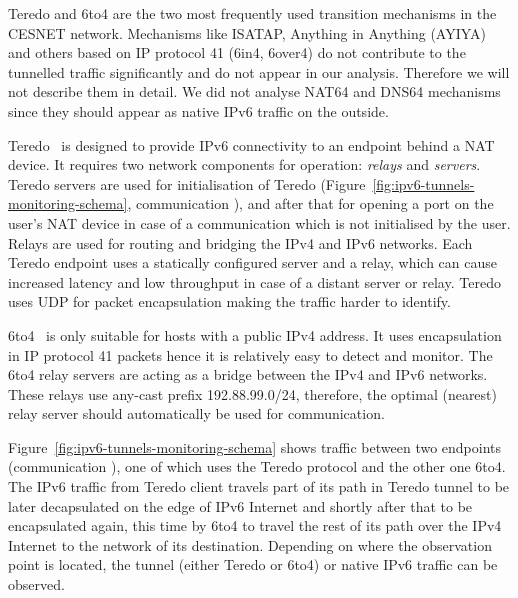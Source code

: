 Teredo and 6to4 are the two most frequently used transition mechanisms in the CESNET network. Mechanisms like ISATAP, Anything in Anything (AYIYA) and others based on IP protocol 41 (6in4, 6over4) do not contribute to the tunnelled traffic significantly and do not appear in our analysis. Therefore we will not describe them in detail. We did not analyse NAT64 and DNS64 mechanisms since they should appear as native IPv6 traffic on the outside.

Teredo~\cite{rfc4380} is designed to provide IPv6 connectivity to an endpoint behind a NAT device. It requires two network components for operation: \emph{relays} and \emph{servers}. Teredo servers are used for initialisation of Teredo (Figure~\ref{fig:ipv6-tunnels-monitoring-schema}, communication ), and after that for opening a port on the user's NAT device in case of a communication which is not initialised by the user. Relays are used for routing and bridging the IPv4 and IPv6 networks. Each Teredo endpoint uses a statically configured server and a relay, which can cause increased latency and low throughput in case of a distant server or relay. Teredo uses UDP for packet encapsulation making the traffic harder to identify.

6to4~\cite{rfc3056} is only suitable for hosts with a public IPv4 address. It uses encapsulation in IP protocol 41 packets hence it is relatively easy to detect and monitor. The 6to4 relay servers are acting as a bridge between the IPv4 and IPv6 networks. These relays use any-cast prefix 192.88.99.0/24, therefore, the optimal (nearest) relay server should automatically be used for communication.

Figure~\ref{fig:ipv6-tunnels-monitoring-schema} shows traffic between two endpoints (communication ), one of which uses the Teredo protocol and the other one 6to4. The IPv6 traffic from Teredo client travels part of its path in Teredo tunnel to be later decapsulated on the edge of IPv6 Internet and shortly after that to be encapsulated again, this time by 6to4 to travel the rest of its path over the IPv4 Internet to the network of its destination. Depending on where the observation point is located, the tunnel (either Teredo or 6to4) or native IPv6 traffic can be observed.

